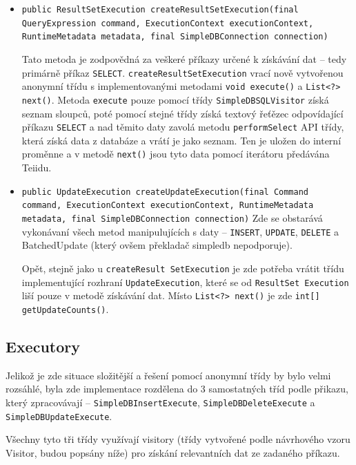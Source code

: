 \documentclass[oneside,12pt,final]{fithesis2}
\begin{document}
\begin{itemize}
 \item \texttt{public ResultSetExecution createResultSetExecution(final\\ QueryExpression command,
			ExecutionContext executionContext, RuntimeMetadata metadata, final SimpleDBConnection connection)}

Tato metoda je zodpovědná za veškeré příkazy určené k získávání dat -- tedy primárně příkaz \texttt{SELECT}.
\texttt{createResultSetExecution} vrací nově vytvořenou anonymní třídu s implementovanými metodami \texttt{void execute()} a \texttt{List<?> next()}. Metoda \texttt{execute} pouze pomocí třídy \texttt{SimpleDBSQLVisitor} získá seznam sloupců, poté pomocí stejné třídy získá textový řeťězec odpovídající příkazu \texttt{SELECT} a nad těmito daty zavolá metodu \texttt{performSelect} API třídy, která získá data z databáze a vrátí je jako seznam. Ten je uložen do interní proměnne a v metodě \texttt{next()} jsou tyto data pomocí iterátoru předávána Teiidu.

\item \texttt{public UpdateExecution createUpdateExecution(final Command\\ command, ExecutionContext executionContext,
			RuntimeMetadata metadata, final SimpleDBConnection connection)}
Zde se obstarává vykonávaní všech metod manipulujících s daty -- \texttt{INSERT}, \texttt{UPDATE}, \texttt{DELETE} a BatchedUpdate (který ovšem překladač simpledb nepodporuje).

Opět, stejně jako u \texttt{createResult SetExecution} je zde potřeba vrátit třídu implementující rozhraní \texttt{UpdateExecution}, které se od \texttt{ResultSet Execution} liší pouze v metodě získávání dat. Místo \texttt{List<?> next()} je zde \texttt{int[] getUpdateCounts()}. 
\end{itemize}
\subsection{Executory}
Jelikož je zde situace složitější a řešení pomocí anonymní třídy by bylo velmi rozsáhlé, byla zde implementace rozdělena do 3 samostatných tříd podle přikazu, který zpracovávají -- \texttt{SimpleDBInsertExecute}, \texttt{SimpleDBDeleteExecute} a \texttt{SimpleDBUpdateExecute}.

Všechny tyto tři třídy využívají visitory (třídy vytvořené podle návrhového vzoru Visitor, budou popsány níže) pro získání relevantních dat ze zadaného příkazu. 
\end{document}
